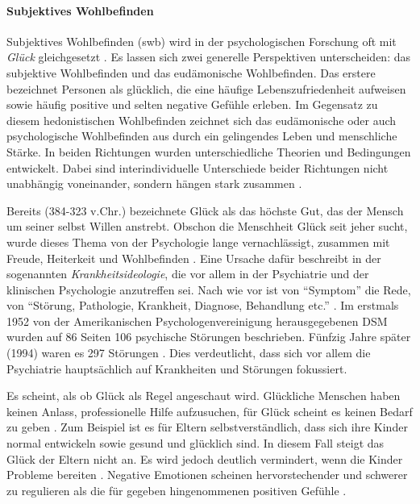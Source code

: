 \paragraph{Subjektives Wohlbefinden}\label{sec:Swb}
Subjektives Wohlbefinden (\acrshort{swb}) wird in der psychologischen Forschung oft mit \textit{Glück} gleichgesetzt \cite{Eid2014}. Es lassen sich zwei generelle Perspektiven unterscheiden: das subjektive Wohlbefinden und das eudämonische Wohlbefinden. Das erstere bezeichnet Personen als glücklich, die eine häufige Lebenszufriedenheit aufweisen sowie häufig positive und selten negative Gefühle erleben. Im Gegensatz zu diesem hedonistischen Wohlbefinden zeichnet sich das eudämonische oder auch psychologische Wohlbefinden aus durch ein gelingendes Leben und menschliche Stärke. In beiden Richtungen wurden unterschiedliche Theorien und Bedingungen entwickelt. Dabei sind interindividuelle Unterschiede beider Richtungen nicht unabhängig voneinander, sondern hängen stark zusammen \cite{Eid2014}.

Bereits  (384-323 v.Chr.) bezeichnete Glück als das höchste Gut, das der Mensch um seiner selbst Willen anstrebt. Obschon die Menschheit Glück seit jeher sucht, wurde dieses Thema von der Psychologie lange vernachlässigt, zusammen mit Freude, Heiterkeit und Wohlbefinden \cite{Tugade2014, Gruber2014}. Eine Ursache dafür beschreibt  in der sogenannten \textit{Krankheitsideologie}, die vor allem in der Psychiatrie und der klinischen Psychologie anzutreffen sei. Nach wie vor ist von \enquote{Symptom} die Rede, von \enquote{Störung, Pathologie, Krankheit, Diagnose, Behandlung etc.} \cite[S.~14]{Maddux2005}. Im erstmals 1952 von der Amerikanischen Psychologenvereinigung herausgegebenen DSM wurden auf 86 Seiten 106 psychische Störungen beschrieben. Fünfzig Jahre später (1994) waren es 297 Störungen \cite{Bucher2009}. Dies verdeutlicht, dass sich vor allem die Psychiatrie hauptsächlich auf Krankheiten und Störungen fokussiert.

Es scheint, als ob Glück als Regel angeschaut wird. Glückliche Menschen haben keinen Anlass, professionelle Hilfe aufzusuchen, für Glück scheint es keinen Bedarf zu geben \cite[S.~14]{Veenhoven1991}. Zum Beispiel ist es für Eltern selbstverständlich, dass sich ihre Kinder normal entwickeln sowie gesund und glücklich sind. In diesem Fall steigt das Glück der Eltern nicht an. Es wird jedoch deutlich vermindert, wenn die Kinder Probleme bereiten \cite{Fingerman2012}. Negative Emotionen scheinen hervorstechender und schwerer zu regulieren als die für gegeben hingenommenen positiven Gefühle \cite{Charles2010}. 

